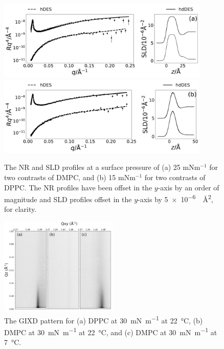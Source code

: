 \documentclass[11pt,a4paper]{paper}
\begin{document}
\begin{figure}[H]
	\centering
	\includegraphics[width=0.9\textwidth]{figures/dmpc_25n_ref_sld}
	\includegraphics[width=0.9\textwidth]{figures/dppc_15n_ref_sld}
	\caption{The NR and SLD profiles at a surface pressure of (a) 25 mNm$^{-1}$ for two contrasts of DMPC, and (b) 15 mNm$^{-1}$ for two contrasts of DPPC. The NR profiles have been offset in the $y$-axis by an order of magnitude and SLD profiles offset in the $y$-axis by \SI{5e-6}{\per\square\angstrom}, for clarity.}
	\label{fig:neutron}
\end{figure}

\begin{figure}[H]
	\centering
	\includegraphics[width=0.50\textwidth]{figures/gixd}
	\caption{The GIXD pattern for (a) DPPC at \SI{30}{\milli\newton\per\meter} at \SI{22}{\celsius}, (b) DMPC at \SI{30}{\milli\newton\per\meter} at \SI{22}{\celsius}, and (c) DMPC at \SI{30}{\milli\newton\per\meter} at \SI{7}{\celsius}.}
	\label{fig:dppcgixd}
\end{figure}
\end{document}
